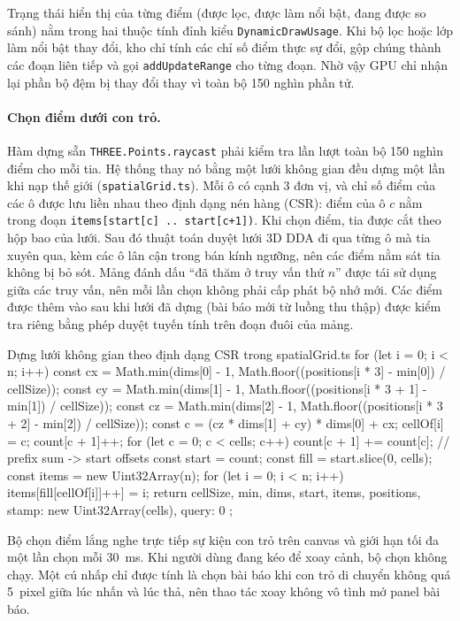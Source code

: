 Trạng thái hiển thị của từng điểm (được lọc, được làm nổi bật, đang được so sánh) nằm trong hai thuộc tính đỉnh kiểu \texttt{DynamicDrawUsage}. Khi bộ lọc hoặc lớp làm nổi bật thay đổi, kho chỉ tính các chỉ số điểm thực sự đổi, gộp chúng thành các đoạn liên tiếp và gọi \texttt{addUpdateRange} cho từng đoạn. Nhờ vậy GPU chỉ nhận lại phần bộ đệm bị thay đổi thay vì toàn bộ 150 nghìn phần tử.

\paragraph{Chọn điểm dưới con trỏ.} Hàm dựng sẵn \texttt{THREE.Points.raycast} phải kiểm tra lần lượt toàn bộ 150 nghìn điểm cho mỗi tia. Hệ thống thay nó bằng một lưới không gian đều dựng một lần khi nạp thế giới (\texttt{spatialGrid.ts}). Mỗi ô có cạnh 3 đơn vị, và chỉ số điểm của các ô được lưu liền nhau theo định dạng nén hàng (CSR): điểm của ô $c$ nằm trong đoạn \texttt{items[start[c] .. start[c+1])}. Khi chọn điểm, tia được cắt theo hộp bao của lưới. Sau đó thuật toán duyệt lưới 3D DDA đi qua từng ô mà tia xuyên qua, kèm các ô lân cận trong bán kính ngưỡng, nên các điểm nằm sát tia không bị bỏ sót. Mảng đánh dấu ``đã thăm ở truy vấn thứ $n$'' được tái sử dụng giữa các truy vấn, nên mỗi lần chọn không phải cấp phát bộ nhớ mới. Các điểm được thêm vào sau khi lưới đã dựng (bài báo mới từ luồng thu thập) được kiểm tra riêng bằng phép duyệt tuyến tính trên đoạn đuôi của mảng.

\begin{tsbox}{Dựng lưới không gian theo định dạng CSR trong spatialGrid.ts}
for (let i = 0; i < n; i++) {
  const cx = Math.min(dims[0] - 1, Math.floor((positions[i * 3] - min[0]) / cellSize));
  const cy = Math.min(dims[1] - 1, Math.floor((positions[i * 3 + 1] - min[1]) / cellSize));
  const cz = Math.min(dims[2] - 1, Math.floor((positions[i * 3 + 2] - min[2]) / cellSize));
  const c = (cz * dims[1] + cy) * dims[0] + cx;
  cellOf[i] = c;
  count[c + 1]++;
}
for (let c = 0; c < cells; c++) count[c + 1] += count[c]; // prefix sum -> start offsets
const start = count;
const fill = start.slice(0, cells);
const items = new Uint32Array(n);
for (let i = 0; i < n; i++) items[fill[cellOf[i]]++] = i;
return { cellSize, min, dims, start, items, positions, stamp: new Uint32Array(cells), query: 0 };
\end{tsbox}

Bộ chọn điểm lắng nghe trực tiếp sự kiện con trỏ trên canvas và giới hạn tối đa một lần chọn mỗi 30~ms. Khi người dùng đang kéo để xoay cảnh, bộ chọn không chạy. Một cú nhấp chỉ được tính là chọn bài báo khi con trỏ di chuyển không quá 5~pixel giữa lúc nhấn và lúc thả, nên thao tác xoay không vô tình mở panel bài báo.

